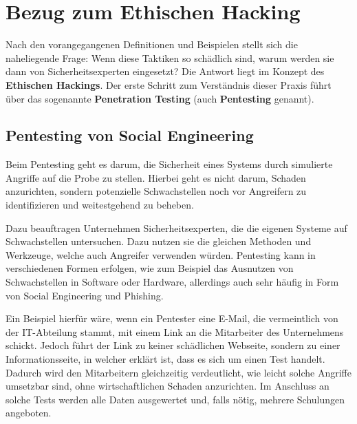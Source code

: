 \documentclass[12pt, a4paper, oneside]{scrartcl}
\begin{document}
\section{Bezug zum Ethischen Hacking}
Nach den vorangegangenen Definitionen und Beispielen stellt sich die naheliegende Frage: Wenn diese Taktiken
so schädlich sind, warum werden sie dann von Sicherheitsexperten eingesetzt? Die Antwort liegt im Konzept
des \textbf{Ethischen Hackings}. Der erste Schritt zum Verständnis dieser Praxis führt über das sogenannte
\textbf{Penetration Testing} (auch \textbf{Pentesting} genannt).

\subsection{Pentesting von Social Engineering}
Beim Pentesting geht es darum, die Sicherheit eines Systems durch simulierte Angriffe auf die 
Probe zu stellen. Hierbei geht es nicht darum, Schaden anzurichten, sondern potenzielle Schwachstellen
noch vor Angreifern zu identifizieren und weitestgehend zu beheben.
\par
Dazu beauftragen Unternehmen Sicherheitsexperten, die die eigenen Systeme auf Schwachstellen untersuchen.
Dazu nutzen sie die gleichen Methoden und Werkzeuge, welche auch Angreifer verwenden würden. Pentesting kann
in verschiedenen Formen erfolgen, wie zum Beispiel das Ausnutzen von Schwachstellen in Software oder Hardware,
allerdings auch sehr häufig in Form von Social Engineering und Phishing.
\par
Ein Beispiel hierfür wäre, wenn ein Pentester eine E-Mail, die vermeintlich von der IT-Abteilung stammt,
mit einem Link an die Mitarbeiter des Unternehmens schickt. Jedoch führt der Link zu keiner schädlichen Webseite, sondern
zu einer Informationsseite, in welcher erklärt ist, dass es sich um einen Test handelt. Dadurch wird 
den Mitarbeitern gleichzeitig verdeutlicht, wie leicht solche Angriffe umsetzbar sind, ohne wirtschaftlichen Schaden
anzurichten. Im Anschluss an solche Tests werden alle Daten ausgewertet und, falls nötig, mehrere Schulungen angeboten.
\end{document}
